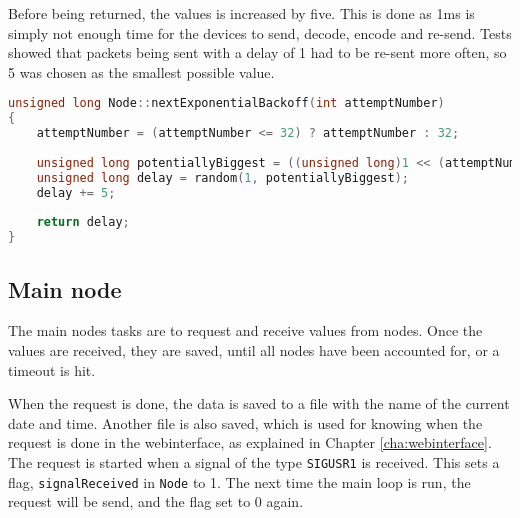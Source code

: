 Before being returned, the values is increased by five. This is done as 1ms is simply not enough time for the devices to send, decode, encode and re-send. Tests showed that packets being sent with a delay of 1 had to be re-sent more often, so 5 was chosen as the smallest possible value.
\begin{lstlisting}[language=C,caption={Exponential backoff on the sensor nodes. In Node.cpp.},label={lst:expbackoff}]
unsigned long Node::nextExponentialBackoff(int attemptNumber)
{
    attemptNumber = (attemptNumber <= 32) ? attemptNumber : 32;
    
    unsigned long potentiallyBiggest = ((unsigned long)1 << (attemptNumber - 1));
    unsigned long delay = random(1, potentiallyBiggest);
    delay += 5;
    
    return delay;
}
\end{lstlisting}


\subsection{Main node} \label{cha:signalhandling}
The main nodes tasks are to request and receive values from nodes. Once the values are received, they are saved, until all nodes have been accounted for, or a timeout is hit.

When the request is done, the data is saved to a file with the name of the current date and time. Another file is also saved, which is used for knowing when the request is done in the webinterface, as explained in Chapter \ref{cha:webinterface}. The request is started when a signal of the type \texttt{SIGUSR1} is received. This sets a flag, \texttt{signalReceived} in \texttt{Node} to 1. The next time the main loop is run, the request will be send, and the flag set to 0 again.